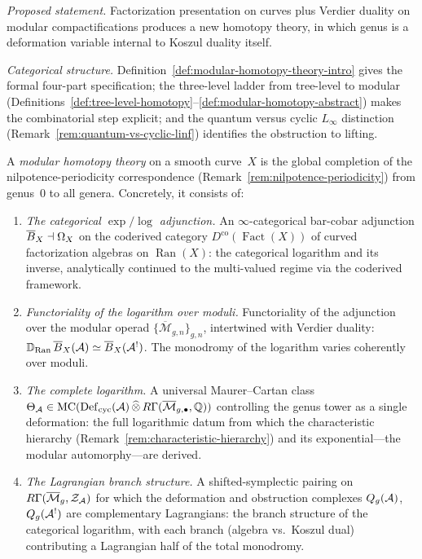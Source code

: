 \emph{Proposed statement.}
Factorization presentation on curves plus Verdier duality on
modular compactifications produces a new homotopy theory, in which
genus is a deformation variable internal to Koszul duality itself.

\emph{Categorical structure.}
Definition~\ref{def:modular-homotopy-theory-intro} gives the
formal four-part specification; the three-level ladder from
tree-level to modular
(Definitions~\ref{def:tree-level-homotopy}--\ref{def:modular-homotopy-abstract})
makes the combinatorial step explicit; and the quantum versus cyclic
$L_\infty$ distinction
(Remark~\ref{rem:quantum-vs-cyclic-linf}) identifies the obstruction
to lifting.

\begin{definition}
\label{def:modular-homotopy-theory-working}
A \emph{modular homotopy theory} on a smooth curve~$X$ is the
global completion of the nilpotence-periodicity correspondence
(Remark~\ref{rem:nilpotence-periodicity}) from genus~$0$ to all
genera.  Concretely, it consists of:
\begin{enumerate}[label=\textup{(\roman*)}]
\item \emph{The categorical $\exp/\log$ adjunction.}  An
  $\infty$-categorical bar-cobar adjunction
  $\overline{B}_X \dashv \Omega_X$ on the coderived category
  $D^{\mathrm{co}}(\operatorname{Fact}(X))$ of curved factorization
  algebras on $\operatorname{Ran}(X)$: the categorical logarithm and
  its inverse, analytically continued to the multi-valued regime via
  the coderived framework.
\item \emph{Functoriality of the logarithm over moduli.}
  Functoriality of the adjunction over the modular operad
  $\{\overline{\mathcal{M}}_{g,n}\}_{g,n}$, intertwined with Verdier
  duality:
  $\mathbb{D}_{\operatorname{Ran}}\,\overline{B}_X(\mathcal{A})
  \simeq \overline{B}_X(\mathcal{A}^!)$.  The monodromy of the logarithm varies
  coherently over moduli.
\item \emph{The complete logarithm.}  A universal Maurer--Cartan class
  $\Theta_{\mathcal{A}} \in
  \operatorname{MC}(\operatorname{Def}_{\mathrm{cyc}}(\mathcal{A})
  \,\widehat{\otimes}\,
  R\Gamma(\overline{\mathcal{M}}_{g,\bullet}, \mathbb{Q}))$
  controlling the genus tower as a single deformation: the full
  logarithmic datum from which the characteristic hierarchy
  (Remark~\ref{rem:characteristic-hierarchy}) and
  its exponential---the modular automorphy---are derived.
\item \emph{The Lagrangian branch structure.}  A shifted-symplectic
  pairing on
  $R\Gamma(\overline{\mathcal{M}}_g, \mathcal{Z}_{\mathcal{A}})$
  for which the deformation and obstruction complexes
  $Q_g(\mathcal{A})$, $Q_g(\mathcal{A}^!)$ are complementary Lagrangians: the
  branch structure of the categorical logarithm, with each
  branch (algebra vs.\ Koszul dual) contributing a Lagrangian
  half of the total monodromy.
\end{enumerate}
\end{definition}

